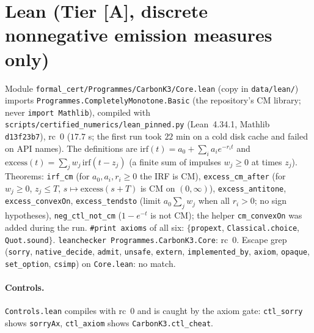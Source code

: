 \documentclass[10pt]{article}
\newcommand{\tier}[1]{\textsf{[#1]}}
\newcommand{\tA}{\tier{A}}
\newcommand{\lean}[1]{\texttt{#1}}
\theoremstyle{plain}
\begin{document}
\section{Lean (Tier \tA{}, discrete nonnegative emission measures only)}\label{sec:lean}
Module \texttt{formal\_cert/Programmes/CarbonK3/Core.lean} (copy in \texttt{data/lean/}) imports \texttt{Programmes.CompletelyMonotone.Basic} (the repository's CM library; never \texttt{import Mathlib}), compiled with \texttt{scripts/certified\_numerics/lean\_pinned.py} (Lean~4.34.1, Mathlib \texttt{d13f23b7}), rc~$0$ ($17.7$ s; the first run took $22$ min on a cold disk cache and failed on API names). The definitions are $\mathrm{irf}(t)=a_0+\sum_ia_ie^{-r_it}$ and $\mathrm{excess}(t)=\sum_jw_j\,\mathrm{irf}(t-z_j)$ (a finite sum of impulses $w_j\ge0$ at times $z_j$). Theorems:
\lean{irf\_cm} (for $a_0,a_i,r_i\ge0$ the IRF is CM), \lean{excess\_cm\_after} (for $w_j\ge0$, $z_j\le T$, $s\mapsto\mathrm{excess}(s+T)$ is CM on $(0,\infty)$), \lean{excess\_antitone}, \lean{excess\_convexOn}, \lean{excess\_tendsto} (limit $a_0\sum_jw_j$ when all $r_i>0$; no sign hypotheses), \lean{neg\_ctl\_not\_cm} ($1-e^{-t}$ is not CM); the helper \lean{cm\_convexOn} was added during the run. \texttt{\#print axioms} of all six: $\{$\lean{propext}, \lean{Classical.choice}, \lean{Quot.sound}$\}$. \texttt{leanchecker Programmes.CarbonK3.Core}: rc~$0$. Escape grep (\lean{sorry}, \lean{native\_decide}, \lean{admit}, \lean{unsafe}, \lean{extern}, \lean{implemented\_by}, \lean{axiom}, \lean{opaque}, \lean{set\_option}, \lean{csimp}) on \texttt{Core.lean}: no match.
\paragraph{Controls.} \texttt{Controls.lean} compiles with rc~$0$ and is caught by the axiom gate: \lean{ctl\_sorry} shows \lean{sorryAx}, \lean{ctl\_axiom} shows \lean{CarbonK3.ctl\_cheat}.
\end{document}
